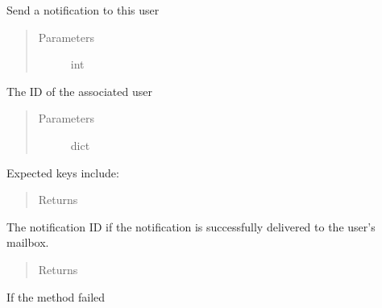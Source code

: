 \documentclass[letterpaper,10pt,english]{sphinxmanual}
\begin{document}
\begin{fulllineitems}
\label{\detokenize{tiger_leagues/models/readme:tiger_leagues.models.user_model.send_notification}}
Send a notification to this user
\begin{quote}\begin{description}
\item[{Parameters}] \leavevmode
{} \textendash{} int

\end{description}\end{quote}

The ID of the associated user
\begin{quote}\begin{description}
\item[{Parameters}] \leavevmode
{} \textendash{} dict

\end{description}\end{quote}

Expected keys include: 
\begin{quote}\begin{description}
\item[{Returns}] \leavevmode
{}

\end{description}\end{quote}

The notification ID if the notification is successfully delivered to the user’s 
mailbox.
\begin{quote}\begin{description}
\item[{Returns}] \leavevmode
{}

\end{description}\end{quote}

If the method failed

\end{fulllineitems}

\end{document}
